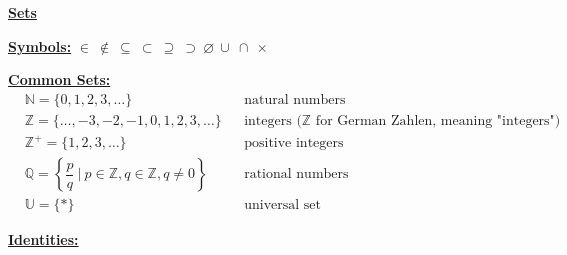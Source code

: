 \documentclass[11pt]{article}
\begin{document}
\newpage

\begin{center}\underline{\bf \large Sets}\end{center}
\bigskip

\underline{\bf Symbols:} $\in \ \not\in \ \subseteq \ \subset \ \supseteq \ \supset \ \varnothing \ \cup \ \cap \ \times$
\bigskip

\underline{\bf Common Sets:} 
\begin{align*}
    &\mathbb{N} = \{0, 1, 2, 3, \dots\}  &&\text{natural numbers} \\
    &\mathbb{Z} = \{\dots, -3, -2, -1, 0, 1, 2, 3, \dots \}  &&\text{integers ($\mathbb{Z}$ for German Zahlen, meaning "integers")} \\
    &\mathbb{Z^+} = \{1,2,3,\dots\}  &&\text{positive integers} \\
    &\mathbb{Q} = \left\{ \dfrac{p}{q} \ \Big| \ p \in \mathbb{Z}, q \in \mathbb{Z}, q \neq 0\right\}  &&\text{rational numbers} \\
    &\mathbb{U} = \{*\}  &&\text{universal set}
\end{align*}
\bigskip

\underline{\bf Identities:}
\end{document}
